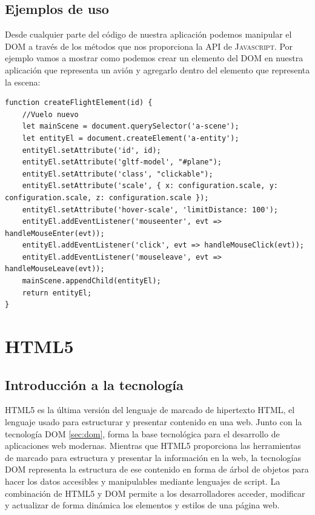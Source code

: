 \documentclass[a4paper, 11pt]{book}
\begin{document}
\subsection{Ejemplos de uso}
Desde cualquier parte del código de nuestra aplicación podemos manipular el \textsc{DOM} a través de los métodos que nos proporciona la \textsc{API} de \textsc{Javascript}. Por ejemplo vamos a mostrar como podemos crear un elemento del DOM en nuestra aplicación que representa un avión y agregarlo dentro del elemento que representa la escena:
\begin{verbatim}
function createFlightElement(id) {
    //Vuelo nuevo
    let mainScene = document.querySelector('a-scene');
    let entityEl = document.createElement('a-entity');
    entityEl.setAttribute('id', id);
    entityEl.setAttribute('gltf-model', "#plane");
    entityEl.setAttribute('class', "clickable");
    entityEl.setAttribute('scale', { x: configuration.scale, y: configuration.scale, z: configuration.scale });
    entityEl.setAttribute('hover-scale', 'limitDistance: 100');
    entityEl.addEventListener('mouseenter', evt => handleMouseEnter(evt));
    entityEl.addEventListener('click', evt => handleMouseClick(evt));
    entityEl.addEventListener('mouseleave', evt => handleMouseLeave(evt));
    mainScene.appendChild(entityEl);
    return entityEl;
}
\end{verbatim}
\section{HTML5}
\label{sec:html5}
\subsection{Introducción a la tecnología}
\textsc{HTML5} es la última versión del lenguaje de marcado de hipertexto \textsc{HTML}, el lenguaje usado para estructurar y presentar contenido en una web. Junto con la tecnología \textsc{DOM} \ref{sec:dom}, forma la base tecnológica para el desarrollo de aplicaciones web modernas. Mientras que \textsc{HTML5} proporciona las herramientas de marcado para estructura y presentar la información en la web, la tecnologías \textsc{DOM} representa la estructura de ese contenido en forma de árbol de objetos para hacer los datos accesibles y manipulables mediante lenguajes de script.
La combinación de \textsc{HTML5} y \textsc{DOM} permite a los desarrolladores acceder, modificar y actualizar de forma dinámica los elementos y estilos de una página web.
\end{document}
